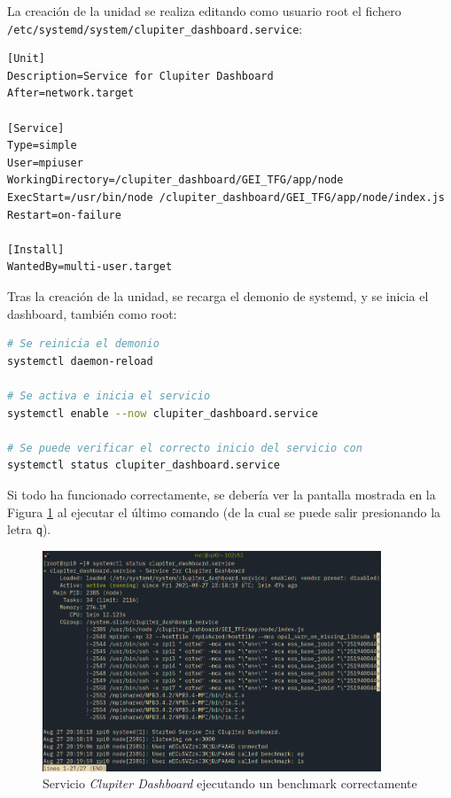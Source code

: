 La creación de la unidad se realiza editando como usuario root el fichero \texttt{/etc/systemd/system/clupiter\_dashboard.service}:

\begin{lstlisting}[]
[Unit]
Description=Service for Clupiter Dashboard
After=network.target

[Service]
Type=simple
User=mpiuser
WorkingDirectory=/clupiter_dashboard/GEI_TFG/app/node
ExecStart=/usr/bin/node /clupiter_dashboard/GEI_TFG/app/node/index.js
Restart=on-failure

[Install]
WantedBy=multi-user.target
\end{lstlisting}

Tras la creación de la unidad, se recarga el demonio de systemd, y se inicia el dashboard, también como root:
\begin{lstlisting}[language=bash]
# Se reinicia el demonio
systemctl daemon-reload

# Se activa e inicia el servicio
systemctl enable --now clupiter_dashboard.service

# Se puede verificar el correcto inicio del servicio con
systemctl status clupiter_dashboard.service
\end{lstlisting}

Si todo ha funcionado correctamente, se debería ver la pantalla mostrada en la Figura \ref{fig:systemd_clupiter_dashboard} al ejecutar el último comando (de la cual se puede salir presionando la letra \texttt{q}).

\begin{figure}[h!]
  \centering
  \vspace*{0.5cm}
  \includegraphics[width=0.9\textwidth]{img/systemd_clupiter_dashboard.png}
  \caption{Servicio \textit{Clupiter Dashboard} ejecutando un benchmark correctamente}
  \label{fig:systemd_clupiter_dashboard}
\end{figure}

